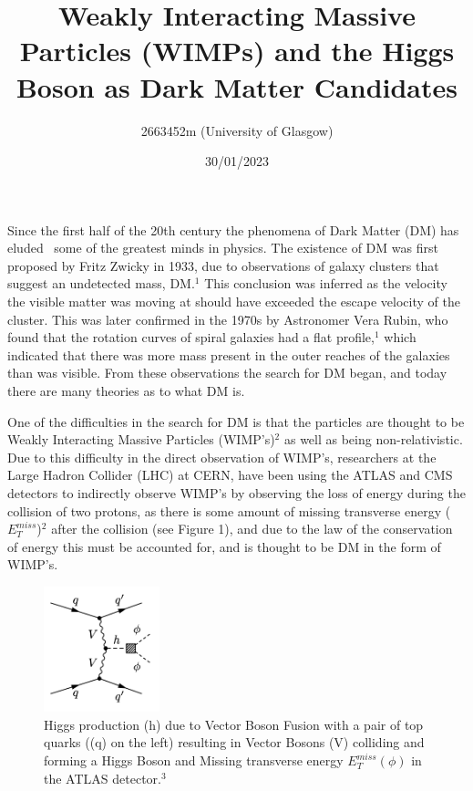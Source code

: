 \documentclass[]{article}
\title{\vspace{-8em}
\textbf{Weakly Interacting Massive Particles (WIMPs) 
and the Higgs Boson as Dark Matter Candidates }}
\author{2663452m (University of Glasgow)}
\date{30/01/2023}
\begin{document}
\maketitle
Since the first half of the 20th century the phenomena of Dark Matter (DM) has eluded \
some of the greatest minds in physics. The existence of DM was first 
proposed by Fritz Zwicky in 1933, due to observations of galaxy clusters that suggest
an undetected mass, DM.$^1$ This conclusion was inferred as the velocity the visible matter was
moving at should have exceeded the escape velocity of the cluster. 
This was later confirmed in the 1970s by Astronomer Vera Rubin, who found that
the rotation curves of spiral galaxies had a flat profile,$^1$ which indicated 
that there was more mass present in the outer reaches of the galaxies than 
was visible. From these observations the search for DM began, and today 
there are many theories as to what DM is.
\parskip 0.2cm


One of the difficulties in the search for DM is that the particles are thought 
to be Weakly Interacting Massive Particles (WIMP's)$^2$ as well as being non-relativistic.
Due to this difficulty in the direct observation of WIMP's, researchers
at the Large Hadron Collider (LHC) at CERN, have been using the ATLAS and CMS 
detectors to indirectly observe WIMP's by observing the loss of energy during the 
collision of two protons, as there is some amount of missing transverse energy ($E^{miss}_{T} $)$^2$
after the collision (see Figure 1), and due to the law of the conservation of energy
this must be accounted for, and is thought to be DM in the form of WIMP's. 



\begin{figure}[h]
\centering  
\includegraphics[width=0.3\textwidth]{images/Feynman Diagrams of missing Tranverse energy.png}
\caption{Higgs production (h) due to Vector Boson Fusion with a pair of top quarks ((q) on the left) resulting in Vector Bosons (V) colliding and forming a Higgs Boson and Missing transverse energy $E^{miss}_{T} (\phi)$ in the ATLAS detector.$^3$}
\label{fig:missing_energy}
\end{figure}
\end{document}
